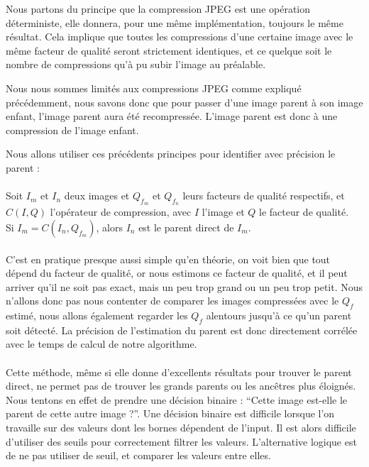 \documentclass[utf8,final]{stageM2R} %
\begin{document}
Nous partons du principe que la compression JPEG est une opération déterministe, elle donnera, pour une même implémentation, toujours le même résultat. Cela implique que toutes les compressions d'une certaine image avec le même facteur de qualité seront strictement identiques, et ce quelque soit le nombre de compressions qu'à pu subir l'image au préalable.

Nous nous sommes limités aux compressions JPEG comme expliqué précédemment, nous savons donc que pour passer d'une image parent à son image enfant, l'image parent aura été recompressée. L'image parent est donc à une compression de l'image enfant.

Nous allons utiliser ces précédents principes pour identifier avec précision le parent : 
\paragraph{}

Soit $I_m$ et $I_n$ deux images et $Q_{f_{m}}$ et $Q_{f_{n}}$ leurs facteurs de qualité respectifs, et $C(I,Q)$ l'opérateur de compression, avec $I$ l'image et $Q$ le facteur de qualité.
\\
Si $I_m = C(I_n, Q_{f_{m}})$, alors $I_n$ est le parent direct de $I_m$.
\paragraph{}

C'est en pratique presque aussi simple qu'en théorie, on voit bien que tout dépend du facteur de qualité, or nous estimons ce facteur de qualité, et il peut arriver qu'il ne soit pas exact, mais un peu trop grand ou un peu trop petit. Nous n'allons donc pas nous contenter de comparer les images compressées avec le $Q_f$ estimé, nous allons également regarder les $Q_f$ alentours jusqu'à ce qu'un parent soit détecté. La précision de l'estimation du parent est donc directement corrélée avec le temps de calcul de notre algorithme. 


\paragraph{}
Cette méthode, même si elle donne d'excellents résultats pour trouver le parent direct, ne permet pas de trouver les grands parents ou les ancêtres plus éloignés. Nous tentons en effet de prendre une décision binaire : ``Cette image est-elle le parent de cette autre image ?''. Une décision binaire est difficile lorsque l'on travaille sur des valeurs dont les bornes dépendent de l'input. Il est alors difficile d'utiliser des seuils pour correctement filtrer les valeurs. L'alternative logique est de ne pas utiliser de seuil, et comparer les valeurs entre elles. 
\end{document}
